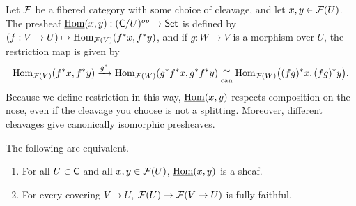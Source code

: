  \begin{definition}\label{lec24D:uhom}
   Let $\mathcal{F}$ be a fibered category with some choice of cleavage, and let $x,y\in \mathcal{F}(U)$.
   The presheaf $\operatorname{\underline{Hom}}(x,y):(\text{\sf C}/U)^{op}\to \text{\sf Set}$ is defined by $(f:V\to U)\mapsto
   \operatorname{Hom}_{\mathcal{F}(V)}(f^*x,f^*y)$, and if $g:W\to V$ is a morphism over $U$, the restriction
   map is given by
   \[
     \operatorname{Hom}_{\mathcal{F}(V)}(f^*x,f^*y)\xrightarrow{g^*}
     \operatorname{Hom}_{\mathcal{F}(W)}(g^*f^*x,g^*f^*y)\underset{\text{can}}{\cong}
     \operatorname{Hom}_{\mathcal{F}(W)}\bigl((fg)^*x,(fg)^*y\bigr).
   \]
   Because we define restriction in this way, $\operatorname{\underline{Hom}}(x,y)$ respects composition on the
   nose, even if the cleavage you choose is not a splitting. Moreover, different
   cleavages give canonically isomorphic presheaves.
 \end{definition}
 \begin{lemma}
   The following are equivalent.
   \begin{enumerate}
     \item For all $U\in \text{\sf C}$ and all $x,y\in \mathcal{F}(U)$, $\operatorname{\underline{Hom}}(x,y)$ is a sheaf.
     \item For every covering $V\to U$, $\mathcal{F}(U)\to \mathcal{F}(V\to U)$ is fully faithful.
   \end{enumerate}
 \end{lemma}
